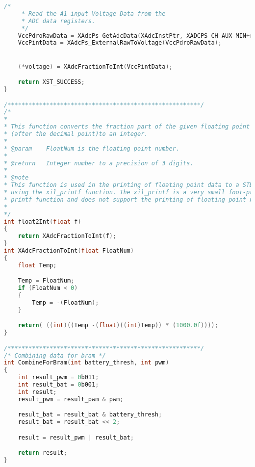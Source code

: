 \documentclass[../report.tex]{subfiles}
\begin{document}
\begin{lstlisting}[language=C, showstringspaces=false]
	/*
	 * Read the A1 input Voltage Data from the
	 * ADC data registers.
	 */
	VccPdroRawData = XAdcPs_GetAdcData(XAdcInstPtr, XADCPS_CH_AUX_MIN+register_offset);
	VccPintData = XAdcPs_ExternalRawToVoltage(VccPdroRawData);


	(*voltage) = XAdcFractionToInt(VccPintData);

	return XST_SUCCESS;
}

/*******************************************************/
/*
*
* This function converts the fraction part of the given floating point number
* (after the decimal point)to an integer.
*
* @param	FloatNum is the floating point number.
*
* @return	Integer number to a precision of 3 digits.
*
* @note
* This function is used in the printing of floating point data to a STDIO device
* using the xil_printf function. The xil_printf is a very small foot-print
* printf function and does not support the printing of floating point numbers.
*
*/
int float2Int(float f)
{
	return XAdcFractionToInt(f);
}
int XAdcFractionToInt(float FloatNum)
{
	float Temp;

	Temp = FloatNum;
	if (FloatNum < 0)
	{
		Temp = -(FloatNum);
	}

	return( ((int)((Temp -(float)((int)Temp)) * (1000.0f))));
}

/*******************************************************/
/* Combining data for bram */
int CombineForBram(int battery_thresh, int pwm)
{
	int result_pwm = 0b011;
	int result_bat = 0b001;
	int result;
	result_pwm = result_pwm & pwm;

	result_bat = result_bat & battery_thresh;
	result_bat = result_bat << 2;

	result = result_pwm | result_bat;

	return result;
}

\end{lstlisting}
\end{document}
